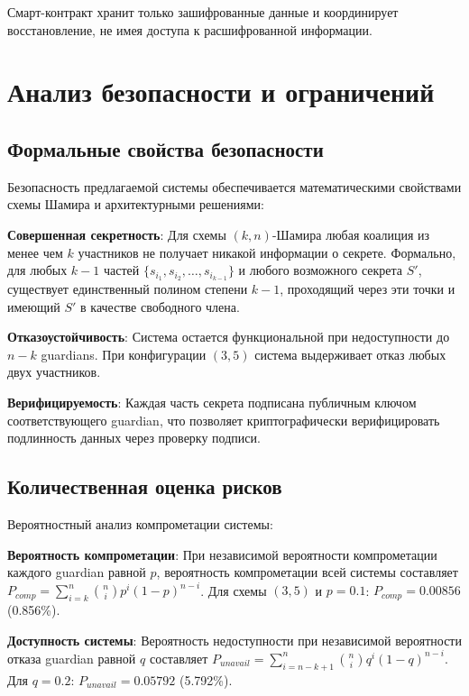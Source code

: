 \documentclass[12pt]{a&t}
\begin{document}
Смарт-контракт хранит только зашифрованные данные и координирует восстановление, не имея доступа к расшифрованной информации.

\section{Анализ безопасности и ограничений}

\subsection{Формальные свойства безопасности}

Безопасность предлагаемой системы обеспечивается математическими свойствами схемы Шамира и архитектурными решениями:

\begin{itemlist}
\item
\textbf{Совершенная секретность}: Для схемы $(k,n)$-Шамира любая коалиция из менее чем $k$ участников не получает никакой информации о секрете. Формально, для любых $k-1$ частей $\{s_{i_1}, s_{i_2}, \ldots, s_{i_{k-1}}\}$ и любого возможного секрета $S'$, существует единственный полином степени $k-1$, проходящий через эти точки и имеющий $S'$ в качестве свободного члена.

\item
\textbf{Отказоустойчивость}: Система остается функциональной при недоступности до $n-k$ guardians. При конфигурации $(3,5)$ система выдерживает отказ любых двух участников.

\item
\textbf{Верифицируемость}: Каждая часть секрета подписана публичным ключом соответствующего guardian, что позволяет криптографически верифицировать подлинность данных через проверку подписи.
\end{itemlist}

\subsection{Количественная оценка рисков}

Вероятностный анализ компрометации системы:

\begin{itemlist}
\item
\textbf{Вероятность компрометации}: При независимой вероятности компрометации каждого guardian равной $p$, вероятность компрометации всей системы составляет $P_{comp} = \sum_{i=k}^{n} \binom{n}{i} p^i (1-p)^{n-i}$. Для схемы $(3,5)$ и $p = 0.1$: $P_{comp} = 0.00856$ (0.856\%).

\item
\textbf{Доступность системы}: Вероятность недоступности при независимой вероятности отказа guardian равной $q$ составляет $P_{unavail} = \sum_{i=n-k+1}^{n} \binom{n}{i} q^i (1-q)^{n-i}$. Для $q = 0.2$: $P_{unavail} = 0.05792$ (5.792\%).
\end{itemlist}
\end{document}
